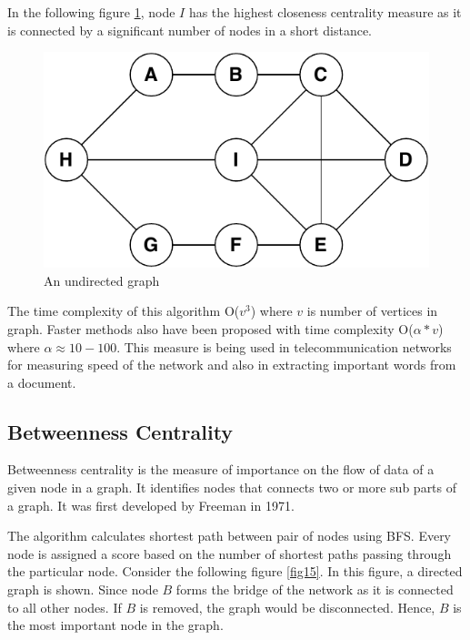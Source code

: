 \documentclass[journal,twoside,web]{ieeecolor}
\begin{document}
In the following figure \ref{fig14}, node $I$ has the highest closeness centrality measure as it is connected by a significant number of nodes in a short distance.

\begin{figure}[!h]
    \centerline{\includegraphics[scale=0.8]{figures/closeness.pdf}}
    \caption{An undirected graph}
    \label{fig14}
\end{figure}

The time complexity of this algorithm O($v^3$) where $v$ is number of vertices in graph. Faster methods also have been proposed with time complexity O($\alpha * v$) where $\alpha \approx 10 - 100$\cite{59}. This measure is being used in telecommunication networks for measuring speed of the network and also in extracting important words from a document.

\subsection{Betweenness Centrality}
Betweenness centrality is the measure of importance on the flow of data of a given node in a graph. It identifies nodes that connects two or more sub parts of a graph. It was first developed by Freeman in 1971\cite{32}.

The algorithm calculates shortest path between pair of nodes using BFS. Every node is assigned a score based on the number of shortest paths passing through the particular node. Consider the following figure \ref{fig15}. In this figure, a directed graph is shown. Since node $B$ forms the bridge of the network as it is connected to all other nodes. If $B$ is removed, the graph would be disconnected. Hence, $B$ is the most important node in the graph.
\end{document}
